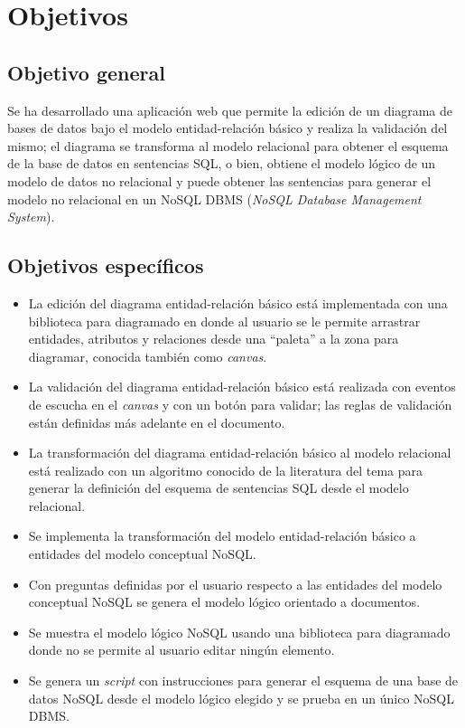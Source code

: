 \section{Objetivos}

\subsection*{Objetivo general}
Se ha desarrollado una aplicación web que permite la edición de un diagrama de bases de datos bajo el modelo entidad-relación básico y realiza la validación del mismo; el diagrama se transforma al modelo relacional para obtener el esquema de la base de datos en sentencias SQL, o bien, obtiene el modelo lógico de un modelo de datos no relacional y puede obtener las sentencias para generar el modelo no relacional en un NoSQL DBMS (\textit{NoSQL Database Management System}).

\subsection*{Objetivos específicos}\label{sec:objSpecifics}


\begin{itemize}
    \item La edición del diagrama entidad-relación básico está implementada con una biblioteca para diagramado en donde al usuario se le permite arrastrar entidades, atributos y relaciones desde una ``paleta'' a la zona para diagramar, conocida también como \textit{canvas}.
    \item La validación del diagrama entidad-relación básico está realizada con eventos de escucha en el \textit{canvas} y con un botón para validar; las reglas de validación están definidas más adelante en el documento.
    \item La transformación del diagrama entidad-relación básico al modelo relacional está realizado con un algoritmo conocido de la literatura del tema para generar la definición del esquema de sentencias SQL desde el modelo relacional.
    \item Se implementa la transformación del modelo entidad-relación básico a entidades del modelo conceptual NoSQL.
    \item Con preguntas definidas por el usuario respecto a las entidades del modelo conceptual NoSQL se genera el modelo lógico orientado a documentos.
    \item Se muestra el modelo lógico NoSQL usando una biblioteca para diagramado donde no se permite al usuario editar ningún elemento.
    \item Se genera un \textit{script} con instrucciones para generar el esquema de una base de datos NoSQL desde el modelo lógico elegido y se prueba en un único NoSQL DBMS.
\end{itemize}

